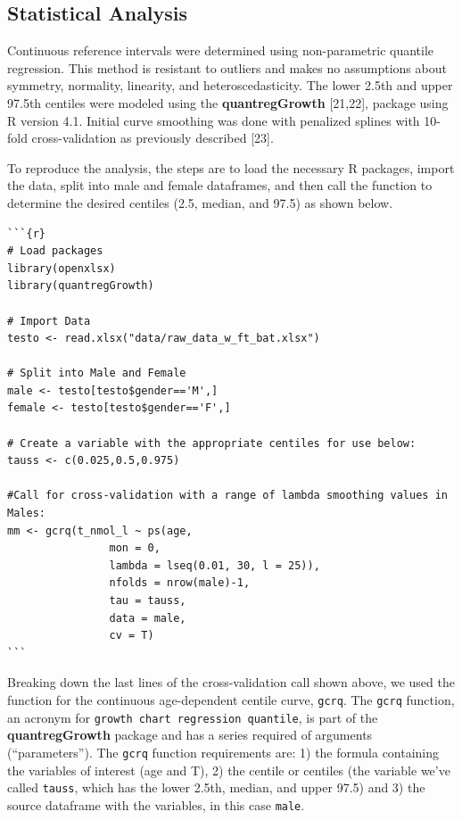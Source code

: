 \documentclass[]{elsarticle} %
\begin{document}
\hypertarget{statistical-analysis}{%
\subsection{Statistical Analysis}\label{statistical-analysis}}

Continuous reference intervals were determined using non-parametric
quantile regression. This method is resistant to outliers and makes no
assumptions about symmetry, normality, linearity, and
heteroscedasticity. The lower 2.5th and upper 97.5th centiles were
modeled using the \textbf{quantregGrowth} {[}21,22{]}, package using R
version 4.1. Initial curve smoothing was done with penalized splines
with 10-fold cross-validation as previously described {[}23{]}.

To reproduce the analysis, the steps are to load the necessary R
packages, import the data, split into male and female dataframes, and
then call the function to determine the desired centiles (2.5, median,
and 97.5) as shown below.

\begin{verbatim}
```{r}
# Load packages
library(openxlsx)
library(quantregGrowth)

# Import Data
testo <- read.xlsx("data/raw_data_w_ft_bat.xlsx")

# Split into Male and Female 
male <- testo[testo$gender=='M',]
female <- testo[testo$gender=='F',]

# Create a variable with the appropriate centiles for use below: 
tauss <- c(0.025,0.5,0.975)

#Call for cross-validation with a range of lambda smoothing values in Males:
mm <- gcrq(t_nmol_l ~ ps(age,
                mon = 0,
                lambda = lseq(0.01, 30, l = 25)),
                nfolds = nrow(male)-1,
                tau = tauss,
                data = male,
                cv = T)
```
\end{verbatim}

Breaking down the last lines of the cross-validation call shown above,
we used the function for the continuous age-dependent centile curve,
\texttt{gcrq}. The \texttt{gcrq} function, an acronym for
\texttt{growth\ chart\ regression\ quantile}, is part of the
\textbf{quantregGrowth} package and has a series required of arguments
(``parameters''). The \texttt{gcrq} function requirements are: 1) the
formula containing the variables of interest (age and T), 2) the centile
or centiles (the variable we've called \texttt{tauss}, which has the
lower 2.5th, median, and upper 97.5) and 3) the source dataframe with
the variables, in this case \texttt{male}.
\end{document}
